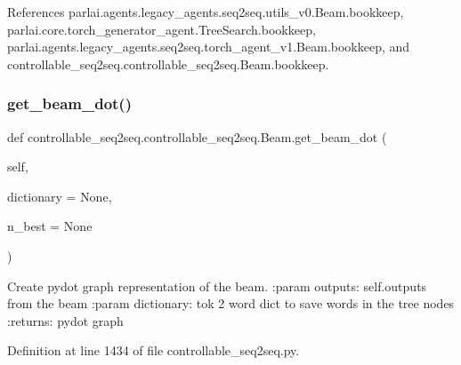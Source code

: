 References parlai.\+agents.\+legacy\+\_\+agents.\+seq2seq.\+utils\+\_\+v0.\+Beam.\+bookkeep, parlai.\+core.\+torch\+\_\+generator\+\_\+agent.\+Tree\+Search.\+bookkeep, parlai.\+agents.\+legacy\+\_\+agents.\+seq2seq.\+torch\+\_\+agent\+\_\+v1.\+Beam.\+bookkeep, and controllable\+\_\+seq2seq.\+controllable\+\_\+seq2seq.\+Beam.\+bookkeep.

\mbox{\label{classcontrollable__seq2seq_1_1controllable__seq2seq_1_1Beam_a4d1acfa68e54ee73cc7fbcb7f334bf99}} 
\subsubsection{\texorpdfstring{get\+\_\+beam\+\_\+dot()}{get\_beam\_dot()}}
{\footnotesize\ttfamily def controllable\+\_\+seq2seq.\+controllable\+\_\+seq2seq.\+Beam.\+get\+\_\+beam\+\_\+dot (\begin{DoxyParamCaption}\item[{}]{self,  }\item[{}]{dictionary = {\ttfamily None},  }\item[{}]{n\+\_\+best = {\ttfamily None} }\end{DoxyParamCaption})}

\begin{DoxyVerb}Create pydot graph representation of the beam.
:param outputs:
    self.outputs from the beam
:param dictionary:
    tok 2 word dict to save words in the tree nodes
:returns:
    pydot graph
\end{DoxyVerb}
 

Definition at line 1434 of file controllable\+\_\+seq2seq.\+py.



